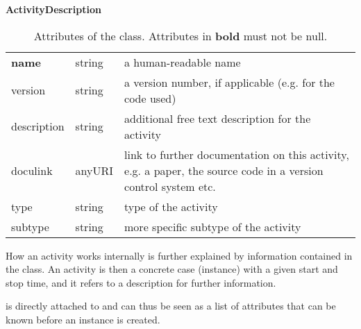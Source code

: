 \begin{table}[ht]
\small
{}\textwidth
\textbf{\normalsize ActivityDescription}\vspace{0.25em}\\
\begin{tabulary}{1.0\textwidth}{llL}
\toprule
{} &   & \\
\midrule
\textbf{name}         & string & a human-readable name\\
version      & string & a version number, if applicable (e.g. for the code used)\\
description  & string & additional free text description for the activity\\
doculink     & anyURI & link to further documentation on this activity, e.g. a 
paper, the source code in a version control system etc.\\
type        & string & type of the activity\\
subtype     & string & more specific subtype of the activity\\
\bottomrule
\end{tabulary}
\caption[Attributes of the  class]{Attributes of the  class. Attributes in \textbf{bold} must not be null.
}\label{tab:activitydescription}
\end{table}


How an activity works internally is further explained by information contained in the  class.
An activity is then a concrete case (instance) with a given start and stop time, and it refers to a description for further information.

 is directly attached to  and can thus be seen as a list of attributes that can be known before an  instance is created. 

